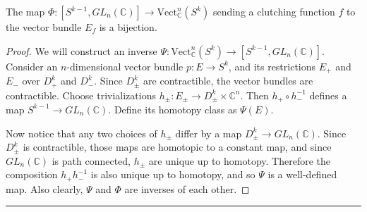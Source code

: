 \begin{prop} The map $\Phi:[S^{k-1},GL_n(\mathbb{C})]\rightarrow \textrm{Vect}_\mathbb{C}^n(S^k)$ sending a clutching function $f$ to the vector bundle $E_f$ is a bijection.
\end{prop}
\begin{proof}
We will construct an inverse $\Psi:\textrm{Vect}_\mathbb{C}^n(S^k)\rightarrow [S^{k-1},GL_n(\mathbb{C})]$. Consider an $n$-dimensional vector bundle $p:E\rightarrow S^k$, and its restrictions $E_+$ and $E_-$ over $D_+^k$ and $D_-^k$. Since $D_\pm^k$ are contractible, the vector bundles are contractible. Choose trivializations $h_\pm :E_\pm \rightarrow D_\pm^k \times \mathbb{C}^n$. Then $h_+\circ h_-^{-1}$ defines a map $S^{k-1}\rightarrow GL_n(\mathbb{C})$. Define its homotopy class as $\Psi(E)$.

Now notice that any two choices of $h_\pm$ differ by a map $D_\pm^k\rightarrow GL_n(\mathbb{C})$. Since $D_\pm^k$ is contractible, those maps are homotopic to a constant map, and since $GL_n(\mathbb{C})$ is path connected, $h_\pm$ are unique up to homotopy. Therefore the composition $h_+ h_-^{-1}$ is also unique up to homotopy, and so $\Psi$ is a well-defined map. Also clearly, $\Psi$ and $\Phi$ are inverses of each other.
\end{proof}

\noindent\rule{\textwidth}{1pt}
\newline